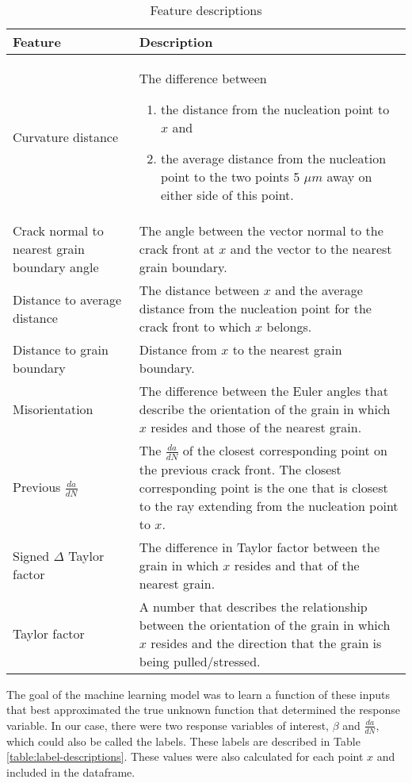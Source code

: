 \begin{table}[p]
  \centering
  \caption{Feature descriptions}
  \label{table:feature-descriptions}
  \begin{tabular}{| p{3cm} | p{11cm} |}
  \hline
  \textbf{Feature} & \textbf{Description} \\
  \hline
  Curvature distance & The difference between
  \begin{enumerate}
    \item the distance from the nucleation point to $x$ and 
    \item the average distance from the nucleation point to the two points 5 $\mu m$ away on either side of this point.
  \end{enumerate} \\ \hline
  Crack normal to nearest grain boundary angle & The angle between the vector normal to the crack front at $x$ and the vector to the nearest grain boundary. \\ \hline
  Distance to average distance & The distance between $x$ and the average distance from the nucleation point for the crack front to which $x$ belongs. \\ \hline
  Distance to grain boundary & Distance from $x$ to the nearest grain boundary. \\ \hline
  Misorientation & The difference between the Euler angles that describe the orientation of the grain in which $x$ resides and those of the nearest grain. \\ \hline
  Previous $\frac{da}{dN}$ & The $\frac{da}{dN}$ of the closest corresponding point on the previous crack front. The closest corresponding point is the one that is closest to the ray extending from the nucleation point to $x$. \\ \hline
  Signed $\Delta$ Taylor factor & The difference in Taylor factor between the grain in which $x$ resides and that of the nearest grain. \\ \hline
  Taylor factor & A number that describes the relationship between the orientation of the grain in which $x$ resides and the direction that the grain is being pulled/stressed. \\ \hline
  \end{tabular}
\end{table}

The goal of the machine learning model was to learn a function of these inputs that best approximated the true unknown function that determined the response variable.  In our case, there were two response variables of interest, $\beta$ and $\frac{da}{dN}$, which could also be called the labels.  These labels are described in Table \ref{table:label-descriptions}.  These values were also calculated for each point $x$ and included in the dataframe.

